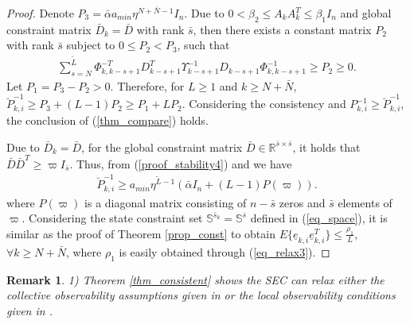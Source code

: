 \documentclass[journal,transmag]{IEEEtran}
\newtheorem{remark}{\textbf{Remark}}
\begin{document}
{\begin{proof}
Denote $P_3=\bar\alpha a_{min}\eta^{N+\bar N-1}I_n$.		
Due to $0<\beta_2\leq A_{k}A_{k}^T\leq \beta_1 I_n$ and global constraint matrix $\bar D_{k}=\bar D$ with rank $\bar s$, then there exists a constant matrix $P_2$ with rank $\bar s$ subject to $0\leq P_2< P_3$, such that
\begin{align*}
\sum_{s=N}^{\tilde L}\Phi_{ k, k-s+1}^{-T}D_{k-s+1}^T\Upsilon_{k-s+1}^{-1}D_{k-s+1}\Phi_{ k, k-s+1}^{-1}\geq P_2\geq 0.
\end{align*}
Let $P_1=P_3-P_2> 0$. 	Therefore, for $L\geq 1$ and $k\geq N+\bar N$, 	$\breve{P}_{ k,i}^{-1}\geq P_3+(L-1)P_2\geq P_1+LP_2$. 
Considering the consistency and $P_{k,i}^{-1}\geq \breve{P}_{ k,i}^{-1}$, the conclusion of (\ref{thm_compare}) holds.


Due to $\bar D_{k}=\bar D$, for the global constraint matrix $\bar D\in\mathbb{R}^{\bar s\times\bar s}$, it holds that $\bar D\bar D^T\geq \varpi I_{\bar s}$.
Thus, from (\ref{proof_stability4}) and  we have
\begin{align}\label{eq_relax3}
\breve{P}_{ k,i}^{-1}\geq a_{min}\eta^{\tilde L-1} \left(\bar\alpha I_{n}+(L-1)P(\varpi)\right).
\end{align}
where $P(\varpi)$ is a diagonal matrix consisting of $n-\bar s$ zeros and $\bar s$ elements of $\varpi$.
Considering the state constraint set $\mathbb{S}^{\bar s_k}=\mathbb{S}^{\bar s}$ defined in (\ref{eq_space}),
it is similar as the proof of Theorem \ref{prop_const} to obtain
$E\{\underline e_{k,i}\underline e_{k,i}^T\}\leq \frac{\rho_1}{L},$ $\forall k\geq  N+\bar N$, where $\rho_1$ is easily obtained through (\ref{eq_relax3}).
	\end{proof}
\begin{remark}
	1) 
	Theorem \ref{thm_consistent} shows the SEC can  relax either the collective observability assumptions given in \cite{Battistelli2014Kullback,Battistelli2015Consensus,Battistelli2016stability,Dm2015Distributed,wang2017convergence} or the local observability conditions given in \cite{olfati2009kalman,stankovic2009consensus,yang2014stochastic}.
		

\end{remark}}
\end{document}
